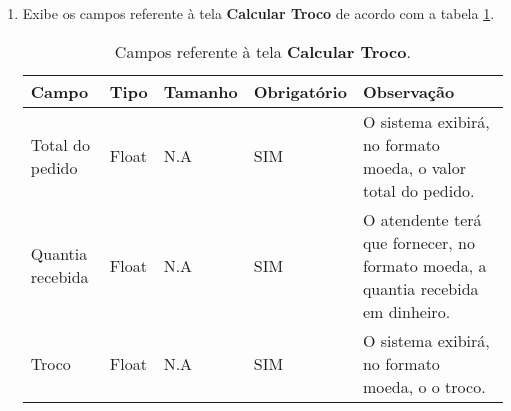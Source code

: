 \begin{enumerate}[label=RN\arabic*]
	\item Exibe os campos referente à tela \textbf{Calcular Troco} de acordo com a tabela \ref{uc008_tb_rn1}. \label{uc008_rn:1}
	\begin{table}[htb]
		\ABNTEXfontereduzida
		\caption[Campos referente à tela \textbf{Calcular Troco}]{Campos referente à tela \textbf{Calcular Troco}.}
		\label{uc008_tb_rn1}
		\begin{tabular}{|p{3.0cm}|p{2.0cm}|p{1.5cm}|p{2.0cm}|p{5.75cm}|}
			\hline
			\textbf{Campo}   & \textbf{Tipo} & \textbf{Tamanho} & \textbf{Obrigatório} & \textbf{Observação}                                                              \\ \hline
			Total do pedido  & Float         & N.A              & SIM                  & O sistema exibirá, no formato moeda, o valor total do pedido.                    \\ \hline
			Quantia recebida & Float         & N.A              & SIM                  & O atendente terá que fornecer, no formato moeda, a quantia recebida em dinheiro. \\ \hline
			Troco            & Float         & N.A              & SIM                  & O sistema exibirá, no formato moeda, o o troco.                                  \\ \hline
		\end{tabular}
	\end{table}
\end{enumerate}